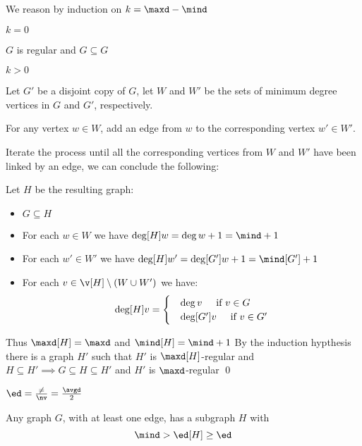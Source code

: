 \begin{prf}
    We reason by induction on $k = \maxd - \mind$

    \boldmath $k = 0$ \unboldmath

    $G$ is regular and $G \subseteq G$
    
    \boldmath $k > 0$ \unboldmath

    Let $G'$ be a disjoint copy of $G$, let $W$ and $W'$ be the sets of minimum degree vertices in $G$ and $G'$, respectively.

    For any vertex $w \in W$, add an edge from $w$ to the corresponding vertex $w' \in W'$.

    Iterate the process until all the corresponding vertices from $W$ and $W'$ have been linked by an edge, we can conclude the following:

    Let $H$ be the resulting graph:
    \begin{itemize}
        \item $G \subseteq H$
        \item For each $w \in W$ we have $\deg[H]{w} = \deg{w} + 1 = \mind + 1$
        \item For each $w' \in W'$ we have $\deg[H]{w'} = \deg[G']{w} + 1 = \mind[G'] + 1$
        \item For each $v \in \v[H] \setminus (W \cup W')$ we have:
        \begin{equation*}
            \deg[H]{v} =
            \begin{cases}
                &\deg{v} \text{\hspace{5mm}if } v \in G\\
                &\deg[G']{v} \text{\hspace{5mm}if } v \in G'
            \end{cases}
        \end{equation*}
    \end{itemize}
    Thus $\maxd[H] = \maxd$ and $\mind[H] = \mind + 1$
    By the induction hypthesis there is a graph $H'$ such that $H'$ is $\maxd[H]$-regular and $H \subseteq H' \implies G \subseteq H \subseteq H'$ and $H'$ is $\maxd$-regular \qed
\end{prf}
\begin{definition}
    $\ed = \frac{\ne}{\nv} = \frac{\avgd}{2}$
\end{definition}
\begin{customproposition}{1.5}
    \label{proposition:1.5}
    Any graph $G$, with at least one edge, has a subgraph $H$ with
    \begin{equation*}
        \mind > \ed[H] \geq \ed
    \end{equation*}
\end{customproposition}
